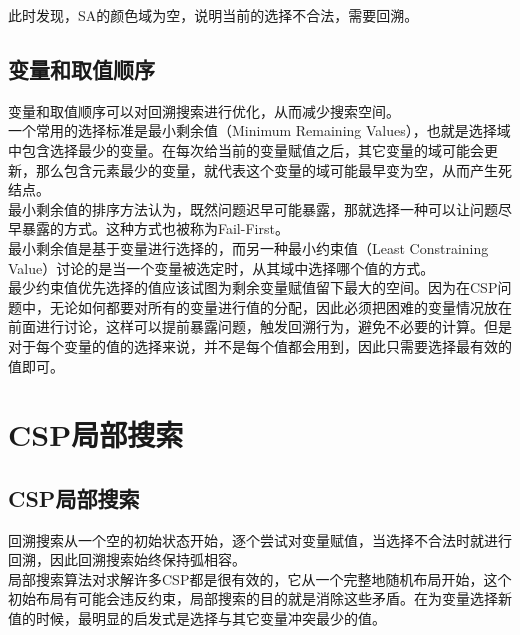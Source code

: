 此时发现，SA的颜色域为空，说明当前的选择不合法，需要回溯。\\

\subsection{变量和取值顺序}

变量和取值顺序可以对回溯搜索进行优化，从而减少搜索空间。\\

一个常用的选择标准是最小剩余值（Minimum Remaining Values），也就是选择域中包含选择最少的变量。在每次给当前的变量赋值之后，其它变量的域可能会更新，那么包含元素最少的变量，就代表这个变量的域可能最早变为空，从而产生死结点。\\

最小剩余值的排序方法认为，既然问题迟早可能暴露，那就选择一种可以让问题尽早暴露的方式。这种方式也被称为Fail-First。\\

最小剩余值是基于变量进行选择的，而另一种最小约束值（Least Constraining Value）讨论的是当一个变量被选定时，从其域中选择哪个值的方式。\\

最少约束值优先选择的值应该试图为剩余变量赋值留下最大的空间。因为在CSP问题中，无论如何都要对所有的变量进行值的分配，因此必须把困难的变量情况放在前面进行讨论，这样可以提前暴露问题，触发回溯行为，避免不必要的计算。但是对于每个变量的值的选择来说，并不是每个值都会用到，因此只需要选择最有效的值即可。\\

\newpage

\section{CSP局部搜索}

\subsection{CSP局部搜索}

回溯搜索从一个空的初始状态开始，逐个尝试对变量赋值，当选择不合法时就进行回溯，因此回溯搜索始终保持弧相容。\\

局部搜索算法对求解许多CSP都是很有效的，它从一个完整地随机布局开始，这个初始布局有可能会违反约束，局部搜索的目的就是消除这些矛盾。在为变量选择新值的时候，最明显的启发式是选择与其它变量冲突最少的值。\\

